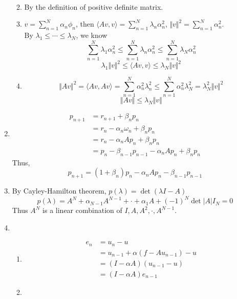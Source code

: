\documentclass{article}
\numberwithin{equation}{section}
\begin{document}
\begin{enumerate}[label=(\alph*)]
\begin{enumerate}[label=\roman*]
\begin{align*}
            \end{align*}
            \item By the definition of positive definite matrix.
            \item $v = \sum_{n=1}^N\alpha_n \phi_n$,  then $\langle Av,v \rangle = \sum_{n=1}^N \lambda_n \alpha_n^2$, $\Vert v \Vert^2 = \sum_{n=1}^N \alpha_n^2$.\\
            By $\lambda_1 \leqslant \cdots \leqslant \lambda_N$,  we know
            $$\sum_{n=1}^N \lambda_1 \alpha_n^2 \leqslant \sum_{n=1}^N \lambda_n \alpha_n^2 \leqslant \sum_{n=1}^N \lambda_N \alpha_n^2$$
            $$\lambda_1 \Vert v \Vert^2 \leqslant \langle Av, v\rangle \leqslant \lambda_N \Vert v \Vert^2$$
            \item $$\Vert Av\Vert^2 = \langle Av, Av \rangle = \sum_{n=1}^N \alpha_n^2 \lambda_n^2 \leqslant \sum_{n=1}^N \alpha_n^2 \lambda_N^2 = \lambda_N^2 \Vert v \Vert^2 $$
            $$\Vert Av \Vert \leqslant \lambda_N \Vert v \Vert$$
        \end{enumerate}
        \item \begin{align*}
            p_{n+1}
            & = r_{n+1} + \beta_n p_n\\
            & = r_n -\alpha_n \omega_n + \beta_n p_n\\
            & = r_n - \alpha_n A p_n + \beta_n p_n\\
            & = p_n - \beta_{n-1}p_{n-1} - \alpha_n A p_n + \beta_n p_n
        \end{align*}
        Thus, $$p_{n+1} = (1+\beta_n)p_n - \alpha_n A p_n - \beta_{n-1}p_{n-1}$$
        \item By Cayley-Hamilton theorem, $p(\lambda) = \det(\lambda I -A)$
        $$p(\lambda) = A^N + \alpha_{N-1}A^{N-1} + \cdot + \alpha_1 A + (-1)^N \det |A|I_N = 0$$
        Thus $A^N$ is a linear combination of $I, A, A^2, \cdot, A^{N-1}$.
        \item \begin{enumerate}[label=\roman*]
            \item \begin{align*}
                e_n
                & = u_n - u\\
                & = u_{n-1} + \alpha(f-Au_{n-1})-u\\
                & = (I-\alpha A) (u_{n-1}-u)\\
                & = (I-\alpha A)e_{n-1}
            \end{align*}
            \item \begin{align*}

\end{align*}
\end{enumerate}
\end{enumerate}
\end{document}
